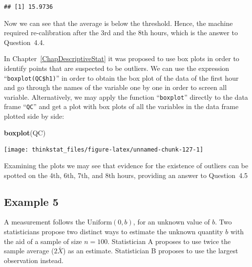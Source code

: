 \documentclass[]{krantz}
\makeatletter
\newenvironment{Shaded}{\begin{snugshade}}{\end{snugshade}}
\newcommand{\KeywordTok}[1]{\textcolor[rgb]{0.13,0.29,0.53}{\textbf{#1}}}
\newcommand{\OperatorTok}[1]{\textcolor[rgb]{0.81,0.36,0.00}{\textbf{#1}}}
\newcommand{\NormalTok}[1]{#1}
\newenvironment{kframe}{%
\medskip{}
\setlength{\fboxsep}{.8em}
 \def\at@end@of@kframe{}%
 \ifinner\ifhmode%
  \def\at@end@of@kframe{\end{minipage}}%
  \begin{minipage}{\columnwidth}%
 \fi\fi%
 \def\FrameCommand##1{\hskip\@totalleftmargin \hskip-\fboxsep
 \colorbox{shadecolor}{##1}\hskip-\fboxsep
     \hskip-\linewidth \hskip-\@totalleftmargin \hskip\columnwidth}%
 \MakeFramed {\advance\hsize-\width
   \@totalleftmargin\z@ \linewidth\hsize
   \@setminipage}}%
 {\par\unskip\endMakeFramed%
 \at@end@of@kframe}
\renewenvironment{Shaded}{\begin{kframe}}{\end{kframe}}
\theoremstyle{definition}
\theoremstyle{definition}
\theoremstyle{definition}
\theoremstyle{remark}
\makeatother
\begin{document}
\begin{Shaded}
\end{Shaded}

\begin{verbatim}
## [1] 15.9736
\end{verbatim}

Now we can see that the average is below the threshold. Hence, the
machine required re-calibration after the 3rd and the 8th hours, which
is the answer to Question~4.4.

In Chapter~\ref{ChapDescriptiveStat} it was proposed to use box plots in
order to identify points that are suspected to be outliers. We can use
the expression ``\texttt{boxplot(QC\$h1)}'' in order to obtain the box
plot of the data of the first hour and go through the names of the
variable one by one in order to screen all variable. Alternatively, we
may apply the function ``\texttt{boxplot}'' directly to the data frame
``\texttt{QC}'' and get a plot with box plots of all the variables in
the data frame plotted side by side:

\begin{Shaded}
\begin{Highlighting}[]
\KeywordTok{boxplot}\NormalTok{(QC)}
\end{Highlighting}
\end{Shaded}

\begin{center}\texttt{[image: thinkstat\_files/figure-latex/unnamed-chunk-127-1]} \end{center}

Examining the plots we may see that evidence for the existence of
outliers can be spotted on the 4th, 6th, 7th, and 8th hours, providing
an answer to Question~4.5

\subsection{Example 5}\label{example-5}

A measurement follows the \(\mbox{Uniform}(0,b)\), for an unknown value
of \(b\). Two statisticians propose two distinct ways to estimate the
unknown quantity \(b\) with the aid of a sample of size \(n=100\).
Statistician A proposes to use twice the sample average (\(2 \bar X\))
as an estimate. Statistician B proposes to use the largest observation
instead.
\end{document}

